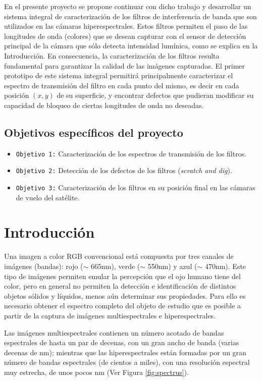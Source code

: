 \documentclass{ctuthesis}
\begin{document}
En el presente proyecto se propone continuar con dicho trabajo y desarrollar un 
sistema integral de caracterización de los filtros de interferencia de banda 
que son utilizados en las cámaras hiperespectrales. Estos filtros permiten el 
paso de las longitudes de onda (colores) que se desean capturar con el sensor 
de detección principal de la cámara que sólo detecta intensidad lumínica, como 
se explica en la Introducción. En consecuencia, la caracterización de los 
filtros resulta fundamental para garantizar la calidad de las imágenes 
capturadas. El primer prototipo de este sistema integral permitirá 
principalmente caracterizar el espectro de transmisión del filtro en 
cada punto del mismo, es decir en cada posición $(x,y)$ de su superficie, y 
encontrar defectos que pudieran modificar su capacidad de bloqueo de ciertas 
longitudes de onda no deseadas.

\subsection*{Objetivos específicos del proyecto}
\begin{itemize}
	
	\item \texttt{Objetivo 1:} Caracterización de los espectros de transmisión 
	de los filtros.
	\item \texttt{Objetivo 2:} Detección de los defectos de los filtros 
	(\textit{scratch and dig}).
	\item \texttt{Objetivo 3:} Caracterización de los filtros en su posición 
	final en las cámaras de vuelo 
	del satélite. \end{itemize}
\section*{Introducción}

\hspace{0.5cm}Una imagen a color RGB convencional está compuesta por tres 
canales de 
imágenes (bandas): rojo 
($\sim$ 665nm), verde ($\sim$ 550nm) y azul ($\sim$ 470nm). Este tipo de 
imágenes permiten emular la percepción que el ojo humano tiene del color, pero 
en general no permiten la detección e identificación de distintos objetos 
sólidos y 
líquidos, menos 
aún determinar sus propiedades. Para ello 
es necesario obtener el espectro completo del objeto de estudio que es posible 
a partir de la captura de imágenes multiespectrales e hiperespectrales.

Las imágenes multiespectrales contienen un número acotado de bandas espectrales 
de hasta un par de decenas, con un gran ancho de banda (varias decenas de nm); 
mientras que las hiperespectrales están formadas por un gran número de bandas 
espectrales (de cientos a miles), con una resolución espectral muy estrecha, de 
unos pocos nm (Ver Figura \ref{fig:spectrus}).
\end{document}
